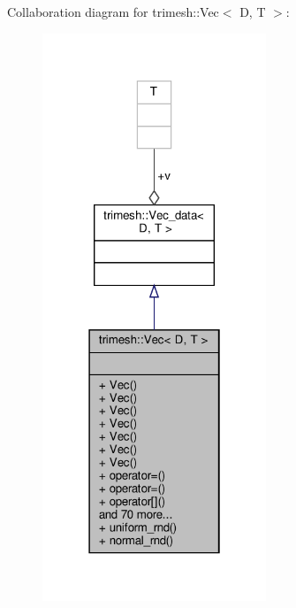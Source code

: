 Collaboration diagram for trimesh\+:\+:Vec$<$ D, T $>$\+:\nopagebreak
\begin{figure}[H]
\begin{center}
\leavevmode
\includegraphics[width=190pt]{dc/d02/classtrimesh_1_1Vec__coll__graph}
\end{center}
\end{figure}
